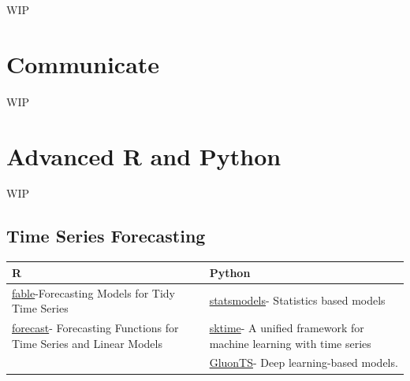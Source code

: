 \documentclass[]{book}
\begin{document}
WIP

\hypertarget{communicate}{%
\chapter{Communicate}\label{communicate}}

WIP

\hypertarget{advanced-r-and-python}{%
\chapter{Advanced R and Python}\label{advanced-r-and-python}}

WIP

\hypertarget{time-series-forecasting}{%
\section{Time Series Forecasting}\label{time-series-forecasting}}

\begin{longtable}[]{@{}ll@{}}
\toprule
\begin{minipage}[b]{0.47\columnwidth}\raggedright
R\strut
\end{minipage} & \begin{minipage}[b]{0.47\columnwidth}\raggedright
Python\strut
\end{minipage}\tabularnewline
\midrule
\endhead
\begin{minipage}[t]{0.47\columnwidth}\raggedright
\href{https://cran.r-project.org/web/packages/fable/index.html}{fable}-Forecasting Models for Tidy Time Series\strut
\end{minipage} & \begin{minipage}[t]{0.47\columnwidth}\raggedright
\href{https://www.statsmodels.org/devel/user-guide.html\#time-series-analysis}{statsmodels}- Statistics based models\strut
\end{minipage}\tabularnewline
\begin{minipage}[t]{0.47\columnwidth}\raggedright
\href{https://cran.r-project.org/web/packages/forecast/index.html}{forecast}- Forecasting Functions for Time Series and Linear Models\strut
\end{minipage} & \begin{minipage}[t]{0.47\columnwidth}\raggedright
\href{https://www.sktime.org/en/latest/}{sktime}- A unified framework for machine learning with time series\strut
\end{minipage}\tabularnewline
\begin{minipage}[t]{0.47\columnwidth}\raggedright
\(\text{}\)\strut
\end{minipage} & \begin{minipage}[t]{0.47\columnwidth}\raggedright
\href{https://ts.gluon.ai/}{GluonTS}- Deep learning-based models.\strut
\end{minipage}\tabularnewline
\bottomrule
\end{longtable}


\end{document}
